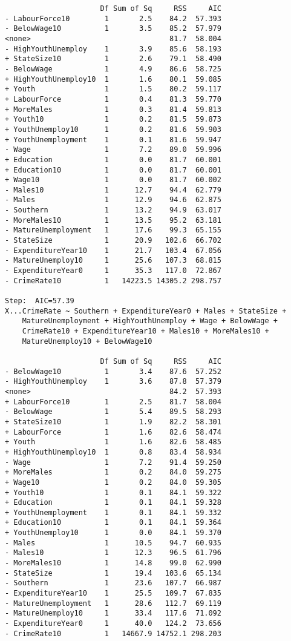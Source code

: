 \documentclass[11pt]{article}
\begin{document}
\begin{enumerate}
\begin{verbatim}
                      Df Sum of Sq     RSS     AIC
- LabourForce10        1       2.5    84.2  57.393
- BelowWage10          1       3.5    85.2  57.979
<none>                                81.7  58.004
- HighYouthUnemploy    1       3.9    85.6  58.193
+ StateSize10          1       2.6    79.1  58.490
- BelowWage            1       4.9    86.6  58.725
+ HighYouthUnemploy10  1       1.6    80.1  59.085
+ Youth                1       1.5    80.2  59.117
+ LabourForce          1       0.4    81.3  59.770
+ MoreMales            1       0.3    81.4  59.813
+ Youth10              1       0.2    81.5  59.873
+ YouthUnemploy10      1       0.2    81.6  59.903
+ YouthUnemployment    1       0.1    81.6  59.947
- Wage                 1       7.2    89.0  59.996
+ Education            1       0.0    81.7  60.001
+ Education10          1       0.0    81.7  60.001
+ Wage10               1       0.0    81.7  60.002
- Males10              1      12.7    94.4  62.779
- Males                1      12.9    94.6  62.875
- Southern             1      13.2    94.9  63.017
- MoreMales10          1      13.5    95.2  63.181
- MatureUnemployment   1      17.6    99.3  65.155
- StateSize            1      20.9   102.6  66.702
- ExpenditureYear10    1      21.7   103.4  67.056
- MatureUnemploy10     1      25.6   107.3  68.815
- ExpenditureYear0     1      35.3   117.0  72.867
- CrimeRate10          1   14223.5 14305.2 298.757

Step:  AIC=57.39
X...CrimeRate ~ Southern + ExpenditureYear0 + Males + StateSize + 
    MatureUnemployment + HighYouthUnemploy + Wage + BelowWage + 
    CrimeRate10 + ExpenditureYear10 + Males10 + MoreMales10 + 
    MatureUnemploy10 + BelowWage10

                      Df Sum of Sq     RSS     AIC
- BelowWage10          1       3.4    87.6  57.252
- HighYouthUnemploy    1       3.6    87.8  57.379
<none>                                84.2  57.393
+ LabourForce10        1       2.5    81.7  58.004
- BelowWage            1       5.4    89.5  58.293
+ StateSize10          1       1.9    82.2  58.301
+ LabourForce          1       1.6    82.6  58.474
+ Youth                1       1.6    82.6  58.485
+ HighYouthUnemploy10  1       0.8    83.4  58.934
- Wage                 1       7.2    91.4  59.250
+ MoreMales            1       0.2    84.0  59.275
+ Wage10               1       0.2    84.0  59.305
+ Youth10              1       0.1    84.1  59.322
+ Education            1       0.1    84.1  59.328
+ YouthUnemployment    1       0.1    84.1  59.332
+ Education10          1       0.1    84.1  59.364
+ YouthUnemploy10      1       0.0    84.1  59.370
- Males                1      10.5    94.7  60.935
- Males10              1      12.3    96.5  61.796
- MoreMales10          1      14.8    99.0  62.990
- StateSize            1      19.4   103.6  65.134
- Southern             1      23.6   107.7  66.987
- ExpenditureYear10    1      25.5   109.7  67.835
- MatureUnemployment   1      28.6   112.7  69.119
- MatureUnemploy10     1      33.4   117.6  71.092
- ExpenditureYear0     1      40.0   124.2  73.656
- CrimeRate10          1   14667.9 14752.1 298.203


\end{verbatim}
\end{enumerate}
\end{document}
